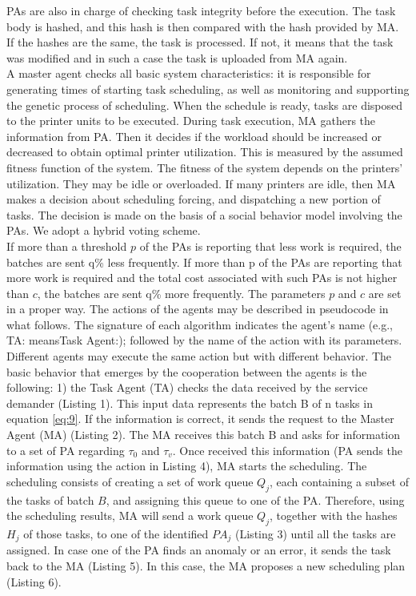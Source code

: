 PAs are also in charge of checking task integrity before the execution. The task body is hashed, and this hash is then compared with the hash provided by MA. If the hashes are the same, the task is processed. If not, it means that the task was modified and in such a case the task is uploaded from MA again.\\
A master agent checks all basic system characteristics: it is responsible for generating times of starting task scheduling, as well as monitoring and supporting the genetic process of scheduling. When the schedule is ready, tasks are disposed to the printer units to be executed. During task execution, MA gathers the information from PA. Then it decides if the workload should be increased or decreased to obtain optimal printer utilization. This is measured by the assumed fitness function of the system. The fitness of the system depends on the printers’ utilization. They may be idle or overloaded. If many printers are idle, then MA makes a decision about scheduling forcing, and dispatching a new portion of tasks. The decision is made on the basis of a social behavior model involving the PAs. We adopt a hybrid voting scheme.\\
If more than a threshold $p$ of the PAs is reporting that less work is required, the batches are sent q\% less frequently. If more than p of the PAs are reporting that more work is required and the total cost associated with such PAs is not higher than $c$, the batches are sent q\% more frequently. The parameters $p$ and $c$ are set in a proper way.
The actions of the agents may be described in pseudocode in what follows. The signature of each algorithm indicates the agent's name (e.g., TA: meansTask Agent:); followed by the name of the action with its parameters. Different agents may execute the same action but with different behavior. The basic behavior that emerges by the cooperation between the agents is the following: 1) the Task Agent (TA) checks the data received by the service demander (Listing 1). This input data represents the batch B of n tasks in equation \ref{eq:9}. If the information is correct, it sends the request to the Master Agent (MA) (Listing 2). The MA receives this batch B and asks for information to a set of PA regarding $\tau_0$ and $\tau_v$. Once received this information (PA sends the information using the action in Listing 4), MA starts the scheduling. The scheduling consists of creating a set of work queue $Q_j$, each containing a subset of the tasks of batch $B$, and assigning this queue to one of the PA. Therefore, using the scheduling results, MA will send a work queue $Q_j$, together with the hashes $H_j$ of those tasks, to one of the identified $PA_j$ (Listing 3) until all the tasks are assigned. In case one of the PA finds an anomaly or an error, it sends the task back to the MA (Listing 5). In this case, the MA proposes a new scheduling plan (Listing 6).
